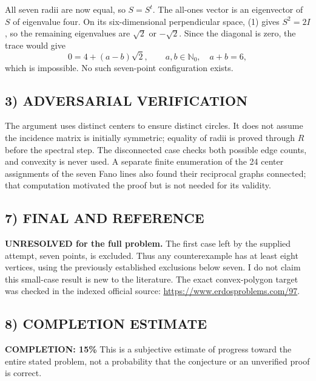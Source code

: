 All seven radii are now equal, so $S=S^t$. The all-ones vector is an
eigenvector of $S$ of eigenvalue four. On its six-dimensional perpendicular
space, (1) gives $S^2=2I$, so the remaining eigenvalues are $\sqrt2$ or
$-\sqrt2$. Since the diagonal is zero, the trace would give
\[
 0=4+(a-b)\sqrt2,\qquad a,b\in\mathbb N_0,\quad a+b=6,
\]
which is impossible. No such seven-point configuration exists.

\subsection*{3) ADVERSARIAL VERIFICATION}
The argument uses distinct centers to ensure distinct circles. It does not
assume the incidence matrix is initially symmetric; equality of radii is
proved through $R$ before the spectral step. The disconnected case checks
both possible edge counts, and convexity is never used. A separate finite
enumeration of the 24 center assignments of the seven Fano lines also found
their reciprocal graphs connected; that computation motivated the proof
but is not needed for its validity.

\subsection*{7) FINAL AND REFERENCE}
\textbf{UNRESOLVED for the full problem.} The first case left by the supplied
attempt, seven points, is excluded. Thus any counterexample has at least
eight vertices, using the previously established exclusions below seven.
I do not claim this small-case result is new to the literature. The exact
convex-polygon target was checked in the indexed official source:
\url{https://www.erdosproblems.com/97}.

\subsection*{8) COMPLETION ESTIMATE}
\textbf{COMPLETION: 15\%}
This is a subjective estimate of progress toward the entire stated problem, not a probability that the conjecture or an unverified proof is correct.
